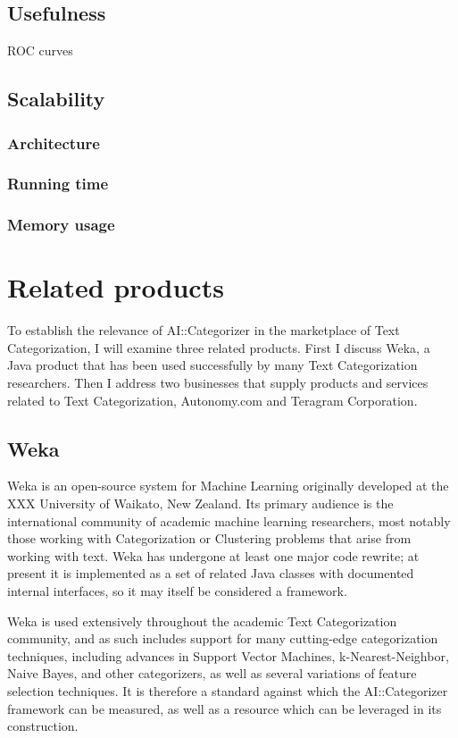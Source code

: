 \documentclass[a4paper]{report}
\begin{document}
\subsection{Usefulness}
ROC curves
\subsection{Scalability}
\subsubsection{Architecture}
\subsubsection{Running time}
\subsubsection{Memory usage}

\section{Related products}

To establish the relevance of AI::Categorizer in the marketplace of
Text Categorization, I will examine three related products.  First I
discuss Weka, a Java product that has been used successfully by many
Text Categorization researchers.  Then I address two businesses that
supply products and services related to Text Categorization,
Autonomy.com and Teragram Corporation.

\subsection{Weka}

Weka is an open-source system for Machine Learning originally
developed at the XXX University of Waikato, New Zealand.  Its primary
audience is the international community of academic machine learning
researchers, most notably those working with Categorization or
Clustering problems that arise from working with text.  Weka has
undergone at least one major code rewrite; at present it is
implemented as a set of related Java classes with documented internal
interfaces, so it may itself be considered a framework.

Weka is used extensively throughout the academic Text Categorization
community, and as such includes support for many cutting-edge
categorization techniques, including advances in Support Vector
Machines, k-Nearest-Neighbor, Naive Bayes, and other categorizers, as
well as several variations of feature selection techniques.  It is
therefore a standard against which the AI::Categorizer framework can
be measured, as well as a resource which can be leveraged in its
construction.
\end{document}
